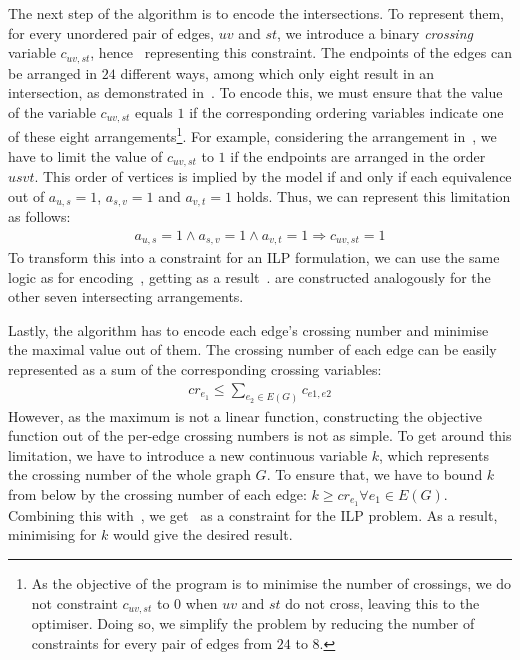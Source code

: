 The next step of the algorithm is to encode the intersections. To represent them, for every unordered pair of edges, \(uv\) and \(st\), we introduce a binary \emph{crossing} variable \(c_{uv, st}\), hence~ representing this constraint. The endpoints of the edges can be arranged in \(24\) different ways, among which only eight result in an intersection, as demonstrated in~. To encode this, we must ensure that the value of the variable \(c_{uv, st}\) equals \(1\) if the corresponding ordering variables indicate one of these eight arrangements\footnote{As the objective of the program is to minimise the number of crossings, we do not constraint \(c_{uv, st}\) to \(0\) when \(uv\) and \(st\) do not cross, leaving this to the optimiser. Doing so, we simplify the problem by reducing the number of constraints for every pair of edges from \(24\) to \(8\).}. For example, considering the arrangement in~, we have to limit the value of \(c_{uv, st}\) to \(1\) if the endpoints are arranged in the order \(usvt\). This order of vertices is implied by the model if and only if each equivalence out of \(a_{u,s} = 1\), \(a_{s,v} = 1\) and \(a_{v,t} = 1\) holds. Thus, we can represent this limitation as follows:
\begin{align*}
    a_{u,s} = 1 \land a_{s,v} = 1 \land a_{v,t} = 1 \Longrightarrow c_{uv, st} = 1
\end{align*}
To transform this into a constraint for an ILP formulation, we can use the same logic as for encoding~, getting as a result~.  are constructed analogously for the other seven intersecting arrangements.

Lastly, the algorithm has to encode each edge's crossing number and minimise the maximal value out of them. The crossing number of each edge can be easily represented as a sum of the corresponding crossing variables:
\begin{align}
    \label{eq:ilp:crossing-number}
    cr_{e_1} \leqslant \sum_{e_2 \in E(G)} c_{e1, e2}
\end{align}
However, as the maximum is not a linear function, constructing the objective function out of the per-edge crossing numbers is not as simple. To get around this limitation, we have to introduce a new continuous variable \(k\), which represents the crossing number of the whole graph \(G\). To ensure that, we have to bound \(k\) from below by the crossing number of each edge: \(k \geqslant cr_{e_1} \forall e_1 \in E(G)\). Combining this with~, we get~ as a constraint for the ILP problem. As a result, minimising for \(k\) would give the desired result.

